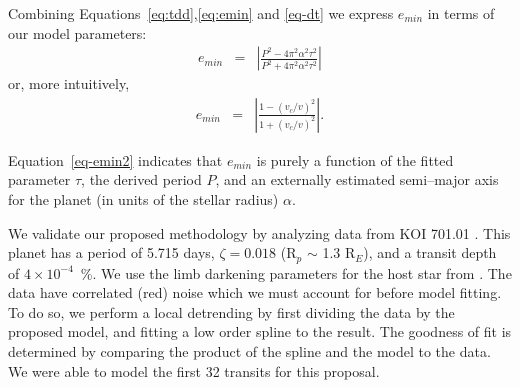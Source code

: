 Combining Equations~\ref{eq:tdd},\ref{eq:emin} and \ref{eq-dt} we express $e_{min}$ in terms of our model
parameters:
\begin{eqnarray}
e_{min} & = & \left| \frac{P^{2} - 4 \pi^{2} \alpha^{2} \tau^{2}}{P^{2} + 4 \pi^{2} \alpha^{2} \tau^{2}} \right| 
\label{eq-emin2}
\end{eqnarray}
or, more intuitively,
\begin{eqnarray}
e_{min} & = & \left| \frac{1 - (v_c/v)^2}{1 + (v_c/v)^2} \right| .
\label{eq-emin3}
\end{eqnarray}

Equation~\ref{eq-emin2} indicates that $e_{min}$ is purely a function
of the fitted parameter $\tau$, the derived period $P$, and an
externally estimated semi--major axis for the planet (in units of the
stellar radius) $\alpha$.  

%

\medskip
{\centerline{}}
\smallskip

We validate our proposed methodology by analyzing \kepler data from KOI
701.01 \citep[Kepler 62--b;][]{2013arXiv1304.7387B}.  This planet has
a period of 5.715 days, $\zeta = 0.018$ (R$_p$ $\sim$ 1.3 R$_E$), and
a transit depth of $4 \times 10^{-4}$~\%.  We use the limb darkening
parameters for the host star from
\cite{2010A&A...510A..21S}.  The \kepler data have correlated (red) noise
which we must account for before model fitting.  To do so, we perform
a local detrending by first dividing the data by the proposed model,
and fitting a low order spline to the result.  The goodness of fit is
determined by comparing the product of the spline and the model to the
data.  We were able to model the first 32 transits for this
proposal.


